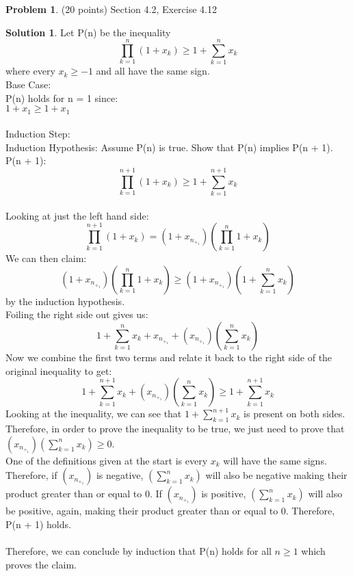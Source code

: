 \documentclass{article}
\theoremstyle{definition}
\newtheorem{problem}{Problem}
\newtheorem*{solution}{Solution}
\begin{document}
\begin{problem} (20 points) Section 4.2, Exercise 4.12
\end{problem}
\begin{solution} 
Let P(n) be the inequality \[ \prod_{k=1}^{n} (1 + x_k) \geqslant 1 + \sum_{k=1}^{n} x_k\] where every $x_k \geqslant -1$ and all have the same sign.\\
Base Case: \\
P(n) holds for n = 1 since: \\
$1 + x_1 \geqslant 1 + x_1$ \\
\\
Induction Step: \\
Induction Hypothesis: Assume P(n) is true. Show that P(n) implies P(n + 1). \\
P(n + 1): \[ \prod_{k=1}^{n + 1} (1 + x_k) \geqslant 1 + \sum_{k=1}^{n + 1} x_k\] \\
Looking at just the left hand side: \[ \prod_{k=1}^{n + 1} (1 + x_k) = (1 + x_n_+_1)(\prod_{k=1}^{n} 1 + x_k)\]
We can then claim: \[(1 + x_n_+_1)(\prod_{k=1}^{n} 1 + x_k) \geqslant (1 + x_n_+_1)(1 + \sum_{k=1}^{n} x_k)\] by the induction hypothesis. \\
Foiling the right side out gives us: \[1 + \sum_{k=1}^{n} x_k + x_n_+_1 + (x_n_+_1)(\sum_{k=1}^{n} x_k)\] Now we combine the first two terms and relate it back to the right side of the original inequality to get:
\[1 + \sum_{k=1}^{n + 1} x_k + (x_n_+_1)(\sum_{k=1}^{n} x_k) \geqslant 1 + \sum_{k=1}^{n + 1} x_k\]
Looking at the inequality, we can see that $1 + \sum_{k=1}^{n + 1} x_k$ is present on both sides. Therefore, in order to prove the inequality to be true, we just need to prove that $(x_n_+_1)(\sum_{k=1}^{n} x_k) \geqslant 0$. \\
One of the definitions given at the start is every $x_k$ will have the same signs. Therefore, if $(x_n_+_1)$ is negative, $(\sum_{k=1}^{n} x_k)$ will also be negative making their product greater than or equal to 0. If $(x_n_+_1)$ is positive, $(\sum_{k=1}^{n} x_k)$ will also be positive, again, making their product greater than or equal to 0. Therefore, P(n + 1) holds. \\
\\
Therefore, we can conclude by induction that P(n) holds for all $n \geqslant 1$ which proves the claim.
\end{solution}
\end{document}
